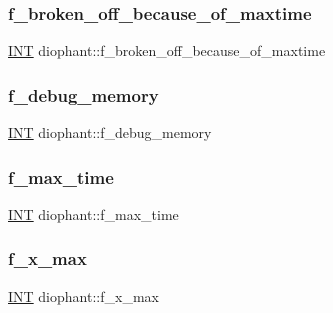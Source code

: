 \subsubsection{\texorpdfstring{f\+\_\+broken\+\_\+off\+\_\+because\+\_\+of\+\_\+maxtime}{f\_broken\_off\_because\_of\_maxtime}}
{\footnotesize\ttfamily \mbox{\hyperlink{galois_8h_a09fddde158a3a20bd2dcadb609de11dc}{I\+NT}} diophant\+::f\+\_\+broken\+\_\+off\+\_\+because\+\_\+of\+\_\+maxtime}

\mbox{\label{classdiophant_a9f4d3ef4f5d255ced17f1069d0e2ab46}} 
\subsubsection{\texorpdfstring{f\+\_\+debug\+\_\+memory}{f\_debug\_memory}}
{\footnotesize\ttfamily \mbox{\hyperlink{galois_8h_a09fddde158a3a20bd2dcadb609de11dc}{I\+NT}} diophant\+::f\+\_\+debug\+\_\+memory\hspace{0.3cm}{\ttfamily [static]}}

\mbox{\label{classdiophant_a66b367b567e70c3c0fe2ed70d98e11b7}} 
\subsubsection{\texorpdfstring{f\+\_\+max\+\_\+time}{f\_max\_time}}
{\footnotesize\ttfamily \mbox{\hyperlink{galois_8h_a09fddde158a3a20bd2dcadb609de11dc}{I\+NT}} diophant\+::f\+\_\+max\+\_\+time}

\mbox{\label{classdiophant_ab148d75d8ec7b1ddc1a8e63bca19f9d5}} 
\subsubsection{\texorpdfstring{f\+\_\+x\+\_\+max}{f\_x\_max}}
{\footnotesize\ttfamily \mbox{\hyperlink{galois_8h_a09fddde158a3a20bd2dcadb609de11dc}{I\+NT}} diophant\+::f\+\_\+x\+\_\+max}

\mbox{\label{classdiophant_a5ccf39f79396a12c1bb7de221f4f6900}} 
